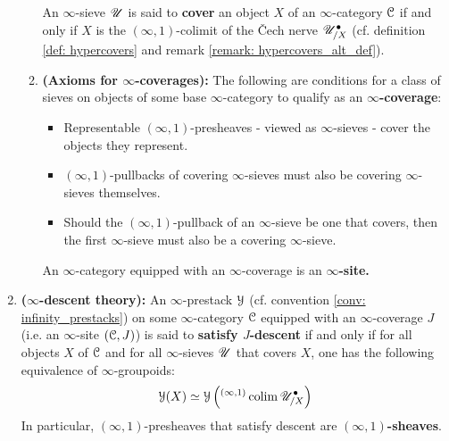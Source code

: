\begin{definition}
\begin{enumerate}
\begin{enumerate}
                                An $\infty$-sieve $\mathscr{U}$ is said to \textbf{cover} an object $X$ of an $\infty$-category $\mathcal{C}$ if and only if $X$ is the $(\infty, 1)$-colimit of the \v{C}ech nerve $\mathscr{U}^{\bullet}_{/X}$ (cf. definition \ref{def: hypercovers} and remark \ref{remark: hypercovers_alt_def}). 
                                \item \textbf{(Axioms for $\infty$-coverages):} The following are conditions for a class of sieves on objects of some base $\infty$-category to qualify as an \textbf{$\infty$-coverage}:
                                    \begin{itemize}
                                        \item Representable $(\infty, 1)$-presheaves - viewed as $\infty$-sieves - cover the objects they represent.
                                        \item $(\infty, 1)$-pullbacks of covering $\infty$-sieves must also be covering $\infty$-sieves themselves. 
                                        \item Should the $(\infty, 1)$-pullback of an $\infty$-sieve be one that covers, then the first $\infty$-sieve must also be a covering $\infty$-sieve.
                                    \end{itemize}
                                An $\infty$-category equipped with an $\infty$-coverage is an \textbf{$\infty$-site.}
                            \end{enumerate}
                        \item \textbf{($\infty$-descent theory):} An $\infty$-prestack $\mathcal{Y}$ (cf. convention \ref{conv: infinity_prestacks}) on some $\infty$-category $\mathcal{C}$ equipped with an $\infty$-coverage $J$ (i.e. an $\infty$-site $(\mathcal{C}, J)$) is said to \textbf{satisfy $J$-descent} if and only if for all objects $X$ of $\mathcal{C}$ and for all $\infty$-sieves $\mathscr{U}$ that covers $X$, one has the following equivalence of $\infty$-groupoids:
                            $$\mathcal{Y}(X) \simeq \mathcal{Y}\left({}^{(\infty, 1)}\operatorname{colim} \mathscr{U}^{\bullet}_{/X}\right)$$
                        In particular, $(\infty, 1)$-presheaves that satisfy descent are \textbf{$(\infty, 1)$-sheaves}.
                    \end{enumerate}
                \end{definition}
                
